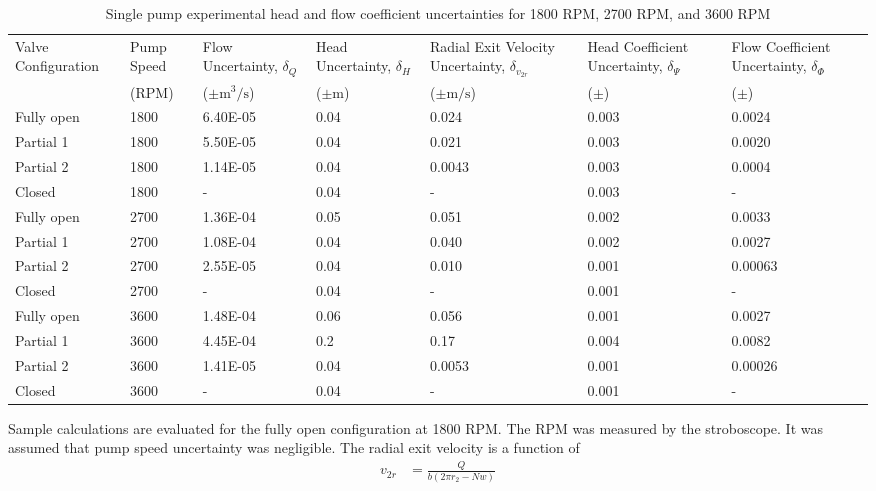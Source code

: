 \begin{table}[h]
    \centering
    \caption{Single pump experimental head and flow coefficient uncertainties for 1800 RPM, 2700 RPM, and 3600 RPM}
    \small  
    \begin{tabular}{lC{0.10\textwidth}C{0.10\textwidth}C{0.10\textwidth}C{0.10\textwidth}C{0.10\textwidth}C{0.10\textwidth}}
    \toprule
    Valve Configuration & Pump Speed & Flow Uncertainty, $\delta_Q$ & Head Uncertainty, $\delta_{H}$ & Radial Exit Velocity Uncertainty, $\delta_{v_{2r}}$ & Head Coefficient Uncertainty, $\delta_{\Psi}$ & Flow Coefficient Uncertainty, $\delta_{\Phi}$ \\
    & (RPM) & ($\pm\unit{\meter\cubed\per\second}$) & ($\pm$m) & ($\pm\unit{\meter\per\second}$) & ($\pm$) & ($\pm$) \\
    \midrule
    Fully open & 1800 & 6.40E-05 & 0.04 & 0.024 & 0.003 & 0.0024 \\
    Partial 1 & 1800 & 5.50E-05 & 0.04 & 0.021 & 0.003 & 0.0020 \\
    Partial 2 & 1800 & 1.14E-05 & 0.04 & 0.0043 & 0.003 & 0.0004 \\
    Closed & 1800 & - & 0.04 & - & 0.003 & - \\
    Fully open & 2700 & 1.36E-04 & 0.05 & 0.051 & 0.002 & 0.0033 \\
    Partial 1 & 2700 & 1.08E-04 & 0.04 & 0.040 & 0.002 & 0.0027 \\
    Partial 2 & 2700 & 2.55E-05 & 0.04 & 0.010 & 0.001 & 0.00063 \\
    Closed & 2700 & - & 0.04 & - & 0.001 & - \\
    Fully open & 3600 & 1.48E-04 & 0.06 & 0.056 & 0.001 & 0.0027 \\
    Partial 1 & 3600 & 4.45E-04 & 0.2 & 0.17 & 0.004 & 0.0082 \\
    Partial 2 & 3600 & 1.41E-05 & 0.04 & 0.0053 & 0.001 & 0.00026 \\
    Closed & 3600 & - & 0.04 & - & 0.001 & - \\
    \bottomrule
    \end{tabular}%
\end{table}
\FloatBarrier
Sample calculations are evaluated for the fully open configuration at 1800 RPM. The RPM was measured by the stroboscope. It was assumed that pump speed uncertainty was negligible. The radial exit velocity is a function of 
\begin{align*}
    v_{2r} &= \frac{Q}{b(2\pi r_2 - Nw)} 
\end{align*}
